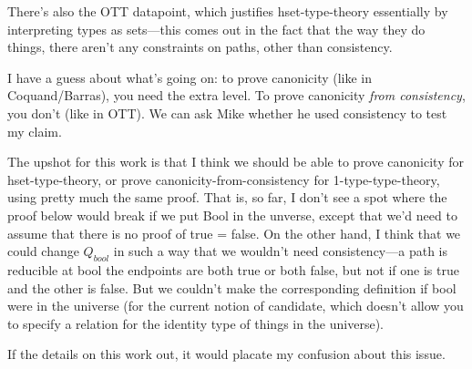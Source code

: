 \documentclass[10pt]{article}
\begin{document}
\begin{enumerate}
  There's also the OTT datapoint, which justifies hset-type-theory
  essentially by interpreting types as sets---this comes out in the fact
  that the way they do things, there aren't any constraints on paths,
  other than consistency.  

  I have a guess about what's going on: to prove canonicity (like in
  Coquand/Barras), you need the extra level.  To prove canonicity
  \emph{from consistency}, you don't (like in OTT).  We can ask Mike
  whether he used consistency to test my claim.  

  The upshot for this work is that I think we should be able to prove
  canonicity for hset-type-theory, or prove canonicity-from-consistency
  for 1-type-type-theory, using pretty much the same proof.  That is, so
  far, I don't see a spot where the proof below would break if we put
  Bool in the unverse, except that we'd need to assume that there is no
  proof of true = false.  On the other hand, I think that we could
  change $Q_{bool}$ in such a way that we wouldn't need consistency---a
  path is reducible at bool the endpoints are both true or both false,
  but not if one is true and the other is false.  But we couldn't make
  the corresponding definition if bool were in the universe (for the
  current notion of candidate, which doesn't allow you to specify a
  relation for the identity type of things in the universe).

  If the details on this work out, it would placate my confusion about
  this issue.
\end{enumerate}


\end{document}
